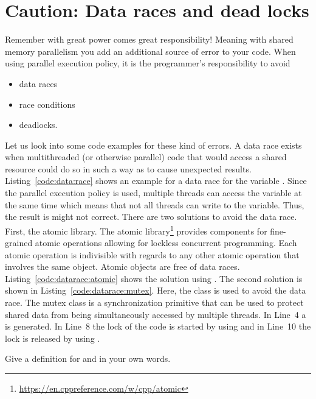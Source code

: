 \documentclass[11pt,fleqn]{book} %
\begin{document}
\section{Caution: Data races and dead locks}
Remember with great power comes great responsibility! Meaning with shared memory parallelism you add an additional source of error to your code. When using parallel execution policy, it is the programmer's responsibility to avoid
\begin{itemize}
\item data races
\item race conditions
\item deadlocks.
\end{itemize} 
Let us look into some code examples for these kind of errors. A data race exists when multithreaded (or otherwise parallel) code that would access a shared resource could do so in such a way as to cause unexpected results. Listing~\ref{code:data:race} shows an example for a data race for the variable . Since the parallel execution policy is used, multiple threads can access the variable  at the same time which means that not all threads can write to the variable. Thus, the result is might not correct. There are two solutions to avoid the data race. First, the atomic library. The atomic library\footnote{\tiny\url{https://en.cppreference.com/w/cpp/atomic}} provides components for fine-grained atomic operations allowing for lockless concurrent programming. Each atomic operation is indivisible with regards to any other atomic operation that involves the same object. Atomic objects are free of data races. Listing~\ref{code:datarace:atomic} shows the solution using . The second solution is shown in Listing~\ref{code:datarace:mutex}. Here, the  class is used to avoid the data race. The mutex class is a synchronization primitive that can be used to protect shared data from being simultaneously accessed by multiple threads. In Line~4 a  is generated. In Line~8 the lock of the code is started by using  and in Line~10 the lock is released by using .

\begin{exercise}
Give a definition for  and  in your own words. 
\end{exercise}
\end{document}
